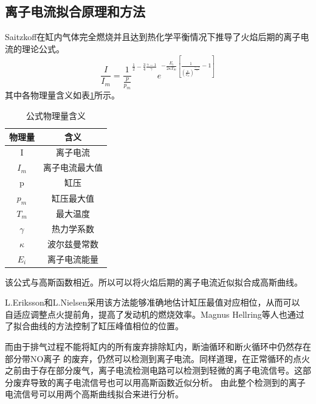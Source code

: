 \subsection{离子电流拟合原理和方法}
Saitzkoff\cite{saitzkoff1996ionization}在缸内气体完全燃烧并且达到热化学平衡情况下推导了火焰后期的离子电流的理论公式。
\begin{equation}
	\frac{I}{I_{m}}=\frac{1}{\frac{p}{p_m}}^{\frac{1}{2}-\frac{3}{4}\frac{\gamma -1}{\gamma}}e^{-\frac{E_i}{2\kappa T_m}[\frac{1}{(\frac{p}{p_m})^{\frac{\gamma -1}{\gamma}}}-1]}
\end{equation}
其中各物理量含义如表\ref{tab:gswllhy}所示。
\begin{table}[htb]
	\centering
	\caption{\label{tab:gswllhy}公式物理量含义}
	\begin{tabular}{cc}
		\toprule[1.5pt]
		物理量&含义\\
		\midrule[1pt]
		I&离子电流\\
		$I_m$&离子电流最大值\\
		p&缸压\\
		$p_m$&缸压最大值\\
		$T_m$&最大温度\\
		$\gamma$&热力学系数\\
		$\kappa$&波尔兹曼常数\\
		$E_i$&离子电流能量\\
		\bottomrule[1.5pt]
	\end{tabular}
\end{table}
该公式与高斯函数相近。所以可以将火焰后期的离子电流近似拟合成高斯曲线。\par
L.Eriksson和L.Nielsen\cite{eriksson1996ignition,eriksson1997closed,eriksson1997ionization}采用该方法能够准确地估计缸压最值对应相位，从而可以
自适应调整点火提前角，提高了发动机的燃烧效率。Magnus Hellring等人也通过了拟合曲线的方法控制了缸压峰值相位的位置\cite{hellring2001comparison}。\par
而由于排气过程不能将缸内的所有废弃排除缸内，断油循环和断火循环中仍然存在部分带NO离子
的废弃，仍然可以检测到离子电流。同样道理，在正常循环的点火之前由于存在部分废气，离子电流检测电路可以检测到轻微的离子电流信号。这部分废弃导致的离子电流信号也可以用高斯函数近似分析。
由此整个检测到的离子电流信号可以用两个高斯曲线拟合来进行分析。






